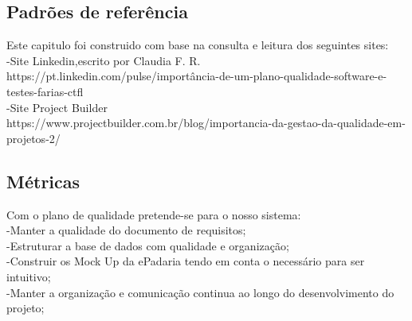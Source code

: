\subsection{Padrões de referência}
Este capitulo foi construido com base na consulta e leitura dos seguintes sites:\\
-Site Linkedin,escrito por Claudia F. R. \\
https://pt.linkedin.com/pulse/importância-de-um-plano-qualidade-software-e-testes-farias-ctfl \\
-Site Project Builder\\
https://www.projectbuilder.com.br/blog/importancia-da-gestao-da-qualidade-em-projetos-2/
\subsection{Métricas}
Com o plano de qualidade pretende-se para o nosso sistema:\\
-Manter a qualidade do documento de requisitos;\\
-Estruturar a base de dados com qualidade e organização;\\
-Construir os Mock Up da ePadaria tendo em conta o necessário para ser intuitivo;\\
-Manter a organização e comunicação continua ao longo do desenvolvimento do projeto;\\